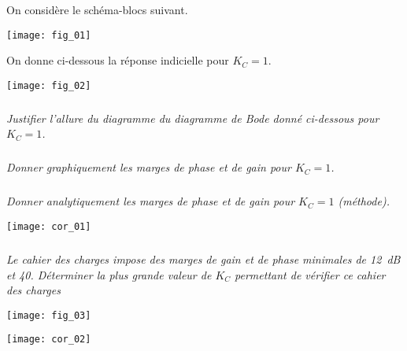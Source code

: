 \ifprof
\else
\begin{multicols}{2}
\fi

\setcounter{exo}{0}
On considère le schéma-blocs suivant. 
\begin{center}
\texttt{[image: fig\_01]}
\end{center}

On donne ci-dessous la réponse indicielle pour $K_C=1$.

\begin{center}
\texttt{[image: fig\_02]}
\end{center}


\subparagraph{}\textit{Justifier l'allure du diagramme du diagramme de Bode donné ci-dessous pour $K_C=1$.}

\subparagraph{}\textit{Donner graphiquement les marges de phase et de gain pour $K_C=1$.}


\subparagraph{}\textit{Donner analytiquement les marges de phase et de gain pour $K_C=1$ (méthode).}
\ifprof
\begin{center}
\texttt{[image: cor\_01]}
\end{center}

\else
\fi


\subparagraph{}\textit{Le cahier des charges impose des marges de gain et de phase minimales de \SI{12}{dB} et 40\degres. Déterminer
la plus grande valeur de $K_C$ permettant de vérifier ce cahier des charges}


\ifprof
\else
\end{multicols}
\fi



\ifprof
\else

\begin{center}
\texttt{[image: fig\_03]}
\end{center}

\fi


\ifprof
\begin{center}
\texttt{[image: cor\_02]}
\end{center}

\else
\fi



